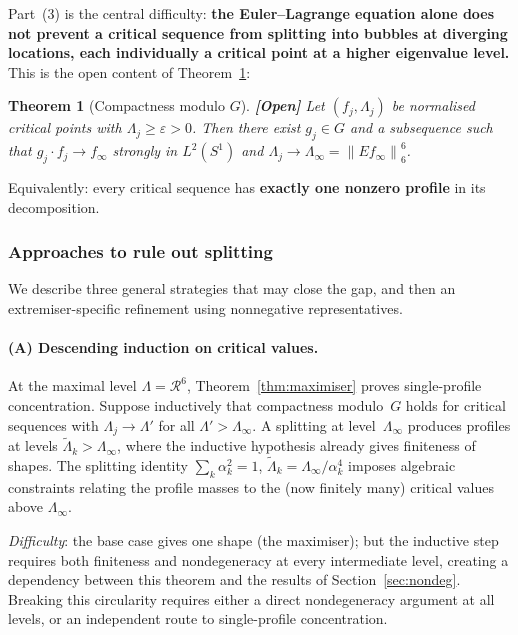 \documentclass[12pt]{article}
\newtheorem{theorem}{Theorem}[section]
\theoremstyle{definition}
\theoremstyle{remark}
\newcommand{\norm}[1]{\left\|#1\right\|}
\newcommand{\open}{\textbf{\color{red}[Open]}}
\begin{document}
Part~(3) is the central difficulty:
\textbf{the Euler--Lagrange equation alone does not prevent a critical
sequence from splitting into bubbles at diverging locations, each
individually a critical point at a higher eigenvalue level.}
This is the open content of Theorem~\ref{thm:compactness-mod-G}:

\begin{theorem}[Compactness modulo $G$]
  \label{thm:compactness-mod-G}
  \open\quad
  Let $(f_j,\Lambda_j)$ be normalised critical points with
  $\Lambda_j\geq\varepsilon>0$.  Then there exist $g_j\in G$ and a
  subsequence such that $g_j\cdot f_j\to f_\infty$ strongly in
  $L^2(S^1)$ and $\Lambda_j\to\Lambda_\infty=\norm{Ef_\infty}_6^6$.
\end{theorem}

Equivalently: every critical sequence has \textbf{exactly one
nonzero profile} in its decomposition.

\subsubsection{Approaches to rule out splitting}

We describe three general strategies that may close the gap, and then an
extremiser-specific refinement using nonnegative representatives.

\paragraph{(A) Descending induction on critical values.}
At the maximal level $\Lambda=\mathcal R^6$,
Theorem~\ref{thm:maximiser} proves single-profile concentration.
Suppose inductively that compactness modulo~$G$ holds for critical
sequences with $\Lambda_j\to\Lambda'$ for all
$\Lambda'>\Lambda_\infty$.  A splitting at level~$\Lambda_\infty$
produces profiles at levels $\widetilde\Lambda_k>\Lambda_\infty$,
where the inductive hypothesis already gives finiteness of shapes.
The splitting identity $\sum_k\alpha_k^2=1$,
$\widetilde\Lambda_k=\Lambda_\infty/\alpha_k^4$ imposes algebraic
constraints relating the profile masses to the (now finitely many)
critical values above $\Lambda_\infty$.

\emph{Difficulty}: the base case gives one shape (the maximiser);
but the inductive step requires both finiteness and nondegeneracy at
every intermediate level, creating a dependency between this theorem
and the results of Section~\ref{sec:nondeg}.  Breaking this
circularity requires either a direct nondegeneracy argument at all
levels, or an independent route to single-profile concentration.
\end{document}
